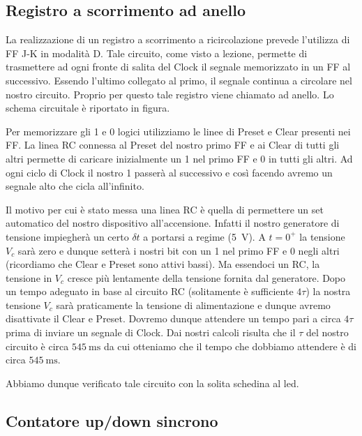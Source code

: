 \subsection{Registro a scorrimento ad anello}
La realizzazione di un registro a scorrimento a ricircolazione prevede l'utilizza di FF J-K in modalità D. Tale circuito, come visto a lezione, permette di trasmettere ad ogni fronte di salita del Clock il segnale memorizzato in un FF al successivo. Essendo l'ultimo collegato al primo, il segnale continua a circolare nel nostro circuito. Proprio per questo tale registro viene chiamato ad anello. Lo schema circuitale è riportato in figura. 

Per memorizzare gli 1 e 0 logici utilizziamo le linee di Preset e Clear presenti nei FF. La linea RC connessa al Preset del nostro primo FF e ai Clear di tutti gli altri permette di caricare inizialmente un 1 nel primo FF e 0 in tutti gli altri. Ad ogni ciclo di Clock il nostro 1 passerà al successivo e così facendo avremo un segnale alto che cicla all'infinito.

Il motivo per cui è stato messa una linea RC è quella di permettere un set automatico del nostro dispositivo all'accensione. Infatti il nostro generatore di tensione impiegherà un certo $\delta t$ a portarsi a regime (\SI{5}{\volt}). A $t=0^+$ la tensione $V_c$ sarà zero e dunque setterà i nostri bit con un 1 nel primo FF e 0 negli altri (ricordiamo che Clear e Preset sono attivi bassi). Ma essendoci un RC, la tensione in $V_c$ cresce più lentamente della tensione fornita dal generatore. Dopo un tempo adeguato in base al circuito RC (solitamente è sufficiente $4\tau$) la nostra tensione $V_c$ sarà praticamente la tensione di alimentazione e dunque avremo disattivate il Clear e Preset. Dovremo dunque attendere un tempo pari a circa $4\tau$ prima di inviare un segnale di Clock. Dai nostri calcoli risulta che il $\tau$ del nostro circuito è circa $\SI{545}{\milli\second}$ da cui otteniamo che il tempo che dobbiamo attendere è di circa $\SI{545}{\milli\second}$.

Abbiamo dunque verificato tale circuito con la solita schedina al led. 

\subsection{Contatore up/down sincrono}

